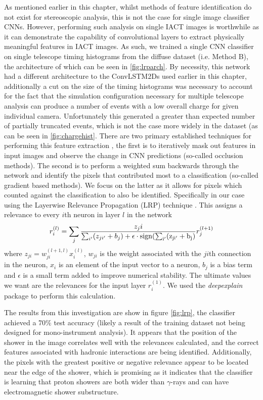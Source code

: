 As mentioned earlier in this chapter, whilst methods of feature identification do not exist for stereoscopic analysis, this is not the case for single image classifier CNNs. However, performing such analysis on single IACT images is worthwhile as it can demonstrate the capability of convolutional layers to extract physically meaningful features in IACT images. As such, we trained a single CNN classifier on single telescope timing histograms from the diffuse dataset (i.e. Method B), the architecture of which can be seen in \ref{fig:lrparch}. By necessity, this network had a different architecture to the ConvLSTM2Ds used earlier in this chapter, additionally a cut on the size of the timing histograms was necessary to account for the fact that the simulation configuration necessary for multiple telescope analysis can produce a number of events with a low overall charge for given individual camera. Unfortunately this generated a greater than expected number of partially truncated events, which is not the case more widely in the dataset (as can be seen in \ref{fig:chargehist}. There are two primary established techniques for performing this feature extraction \cite{deepexplain}, the first is to iteratively mask out features in input images and observe the change in CNN predictions (so-called occlusion methods). The second is to perform a weighted sum backwards through the network and identify the pixels that contributed most to a classification (so-called gradient based methods). We focus on the latter as it allows for pixels which counted against the classification to also be identified. Specifically in our case using the Layerwise Relevance Propagation (LRP) technique \cite{LRP}. This assigns a relevance to every $i$th neuron in layer $l$ in the network
\begin{equation}
r^{(l)}_i=\sum_j\frac{z_ji}{\sum_{i'}(z_{ji'}+b_j)+\epsilon\cdot\rm{sign}(\sum_{i'}(z_{ji'}+b_j)}r_j^{(l+1)}
\end{equation}
where $z_{ji}=w_{ji}^{(l+1,l)}x_i^{(l)}$, $w_{ji}$ is the weight associated with the $ji$th connection in the neuron, $x_i$ is an element of the input vector to a neuron, $b_j$ is a bias term and $\epsilon$ is a small term added to improve numerical stability. The ultimate values we want are the relevances for the input layer $r_i^{(1)}$. We used the \textit{deepexplain} package to perform this calculation.

The results from this investigation are show in figure \ref{fig:lrp}, the classifier achieved a 70$\%$ test accuracy (likely a result of the training dataset not being designed for mono-instrument analysis). It appears that the position of the shower in the image correlates well with the relevances calculated, and the correct features associated with hadronic interactions are being identified. Additionally, the pixels with the greatest positive or negative relevance appear to be located near the edge of the shower, which is promising as it indicates that the classifier is learning that proton showers are both wider than $\gamma$-rays and can have electromagnetic shower substructure. 

